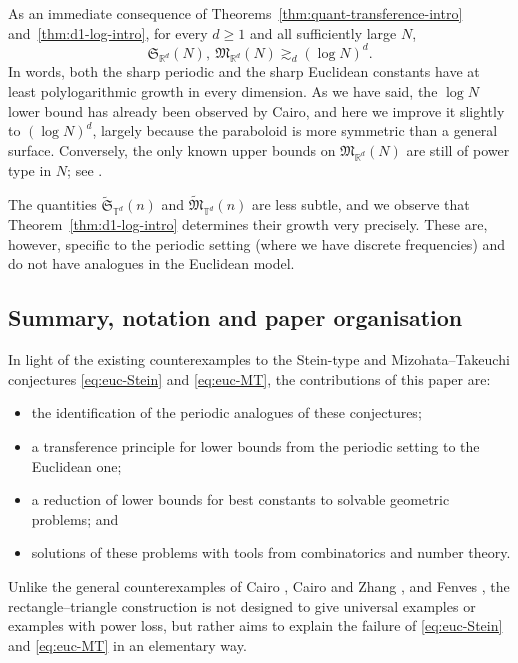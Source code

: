 \documentclass[10pt,a4paper]{amsart}
\numberwithin{equation}{section}
\renewcommand{\ge}{\geqslant}
\begin{document}
As an immediate consequence of Theorems~\ref{thm:quant-transference-intro} and~\ref{thm:d1-log-intro}, for every $d\ge1$ and all sufficiently large $N$,
\begin{equation}\label{eq:justlog2}
\mathfrak{S}_{\mathbb{R}^d}(N),\ \mathfrak{M}_{\mathbb{R}^d}(N)\gtrsim_d (\log N)^d.
\end{equation}
In words, both the sharp periodic and the sharp Euclidean constants have at least polylogarithmic growth in every dimension. As we have said, the $\log N$ lower bound has already been observed by Cairo, and here we improve it slightly to $(\log N)^d$, largely because the paraboloid is more symmetric than a general surface.
Conversely, the only known upper bounds on $\mathfrak{M}_{\mathbb{R}^d}(N)$ are still of power type in $N$; see \cite{CIW}.

The quantities $\widetilde{\mathfrak{S}}_{\mathbb{T}^d}(n)$ and $\widetilde{\mathfrak{M}}_{\mathbb{T}^d}(n)$ are less subtle, and we observe that Theorem~\ref{thm:d1-log-intro} determines their growth very precisely. These are, however, specific to the periodic setting (where we have discrete frequencies) and do not have analogues in the Euclidean model.

\subsection{Summary, notation and paper organisation}
In light of the existing counterexamples to the Stein-type and Mizohata--Takeuchi conjectures \eqref{eq:euc-Stein} and \eqref{eq:euc-MT}, the contributions of this paper are:
\begin{itemize}
\item the identification of the periodic analogues of these conjectures;
\item a transference principle for lower bounds from the periodic setting to the Euclidean one;
\item a reduction of lower bounds for best constants to solvable geometric problems; and
\item solutions of these problems with tools from combinatorics and number theory.
\end{itemize}
Unlike the general counterexamples of Cairo \cite{Cairo}, Cairo and Zhang \cite{CairoZhang}, and Fenves \cite{Fenves}, the rectangle--triangle construction is not designed to give universal examples or examples with power loss, but rather aims to explain the failure of \eqref{eq:euc-Stein} and \eqref{eq:euc-MT} in an elementary way.
\end{document}

